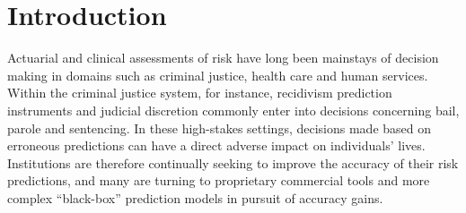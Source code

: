 \documentclass[11pt, sigconf, svgnames]{acmart}
\begin{document}
 
%
%





\maketitle


\section{Introduction}

Actuarial and clinical assessments of risk have long been mainstays of decision making in domains such as criminal justice, health care and human services.  Within the criminal justice system, for instance, recidivism prediction instruments and judicial discretion commonly enter into decisions concerning bail, parole and sentencing.  In these high-stakes settings, decisions made based on erroneous predictions can have a direct adverse impact on individuals’ lives.  Institutions are therefore continually seeking to improve the accuracy of their risk predictions, and many are turning to proprietary commercial tools and more complex ``black-box'' prediction models in pursuit of accuracy gains.  
\end{document}
